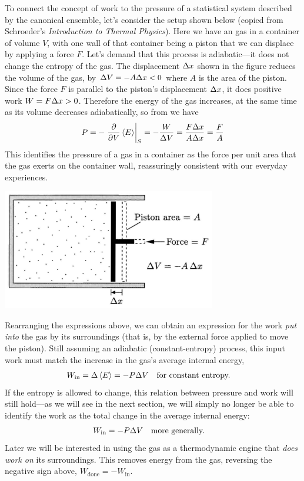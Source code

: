 To connect the concept of work to the pressure of a statistical system described by the canonical ensemble, let's consider the setup shown below (copied from Schroeder's \textit{Introduction to Thermal Physics}).
Here we have an gas in a container of volume $V$, with one wall of that container being a piston that we can displace by applying a force $F$.
Let's demand that this process is adiabatic---it does not change the entropy of the gas.
The displacement $\Delta x$ shown in the figure reduces the volume of the gas, by $\Delta V = -A\Delta x < 0$ where $A$ is the area of the piston.
Since the force $F$ is parallel to the piston's displacement $\Delta x$, it does positive work $W = F\Delta x > 0$.
Therefore the energy of the gas increases, at the same time as its volume decreases adiabatically, so from  we have
\begin{equation}
  P = -\left. \frac{\partial }{\partial V} \left\langle E \right\rangle\right|_S = -\frac{W}{\Delta V} = \frac{F\Delta x}{A\Delta x} = \frac{F}{A}
\end{equation}
This identifies the pressure of a gas in a container as the force per unit area that the gas exerts on the container wall, reassuringly consistent with our everyday experiences.

\begin{center}
  \includegraphics[width=0.7\textwidth]{figs/week05_piston.pdf}
\end{center}

Rearranging the expressions above, we can obtain an expression for the work \textit{put into} the gas by its surroundings (that is, by the external force applied to move the piston).
Still assuming an adiabatic (constant-entropy) process, this input work must match the increase in the gas's average internal energy,
\begin{align*}
  W_{\text{in}} & = \Delta \left\langle E \right\rangle = -P \Delta V & & \mbox{for constant entropy.}
\end{align*}
If the entropy is allowed to change, this relation between pressure and work will still hold---as we will see in the next section, we will simply no longer be able to identify the work as the total change in the average internal energy:
\begin{align}
  \label{eq:work_constP}
  W_{\text{in}} & = -P \Delta V & & \mbox{more generally.}
\end{align}
Later we will be interested in using the gas as a thermodynamic engine that \textit{does work on} its surroundings.
This removes energy from the gas, reversing the negative sign above, $W_{\text{done}} = -W_{\text{in}}$.

